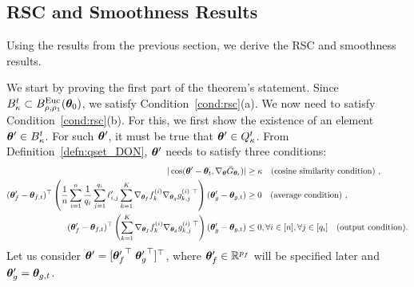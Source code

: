 
\subsection{RSC and Smoothness Results}
Using the results from the previous section, we derive the RSC and smoothness results. 

\RSCLoss*


\proof 
%
We start by proving the first part of the theorem's statement. 
%
Since $B^t_{\kappa}\subset B^{\mathrm{Euc}}_{\rho,\rho_1}({\bm{\theta}}_0)$, we satisfy Condition~\ref{cond:rsc}(a). We now need to satisfy Condition~\ref{cond:rsc}(b). For this, we first show the existence of an element ${\bm{\theta}}' \in B^t_{\kappa}$. For such ${\bm{\theta}}'$, it must be true that ${\bm{\theta}}' \in Q_{\kappa}^t$. From Definition~\ref{defn:qset_DON}, 
${\bm{\theta}}'$ needs to satisfy three conditions: 
\begin{align*}
|\cos(\vtheta' - \vtheta_t, \nabla_{\vtheta} \bar{G}_{\vtheta_t})| & \geq \kappa \quad \text{(cosine similarity condition)}~,\\
%
(\vtheta'_f-\vtheta_{f,t})^\top\left(\frac{1}{n} \sum_{i=1}^n \frac{1}{q_i} \sum_{j=1}^{q_i} \ell'_{i,j} \sum_{k=1}^K \nabla_{\vtheta_{f}} f_k^{(i)} \nabla_{\vtheta_{g}} g_{k,j}^{(i)~\top}\right)(\vtheta'_g-\vtheta_{g,t})  &\geq 0\quad \text{(average condition)}~,\\
%
(\vtheta'_f-\vtheta_{f,t})^\top\left( \sum_{k=1}^K \nabla_{\vtheta_{f}} f_k^{(i)} \nabla_{\vtheta_{g}} g_{k,j}^{(i)~\top}\right)(\vtheta'_g-\vtheta_{g,t})&\leq 0,\forall i\in[n],\forall j\in[q_i]
\quad \text{(output condition)}.
\end{align*}
%
Let us consider 
%
${\bm{\theta}}'=[{{\bm{\theta}}'_f}^{\top}\;{{\bm{\theta}}'_g}^{\top}]^{\top}$,
%
where 
${\bm{\theta}}'_f\in{\mathbb{R}}^{p_f}$ will be specified later and ${\bm{\theta}}'_g = {\bm{\theta}}_{g,t}$. 
